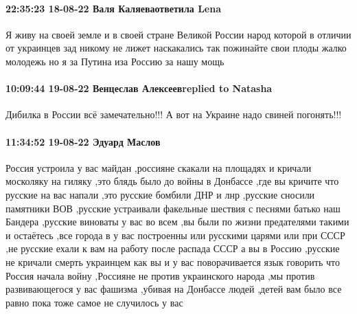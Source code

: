 \paragraph{22:35:23 18-08-22 Валя Каляеваответила Lena}

Я живу на своей земле и в своей стране Великой России народ которой в отличии
от украинцев зад никому не лижет наскакались так пожинайте свои плоды жалко
молодежь но я за Путина иза Россию за нашу мощь

\paragraph{10:09:44 19-08-22 Венцеслав Алексеевreplied to Natasha}

Дибилка в России всё замечательно!!! А вот на Украине надо свиней погонять!!!

\paragraph{11:34:52 19-08-22 Эдуард Маслов}

Россия устроила у вас майдан ,россияне скакали на площадях и кричали москоляку
на гиляку ,это блядь было до войны в Донбассе ,где вы кричите что русские на
вас напали ,это русские бомбили ДНР и лнр ,русские сносили памятники ВОВ
,русские устраивали факельные шествия с песнями батько наш Бандера ,русские
виноваты у вас во всем ,вы были по жизни предателями такими и остаётесь ,все
города в у вас построенны или русскими царями или при СССР ,не русские ехали к
вам на работу после распада СССР а вы в Россию ,русские не кричали смерть
украинцем как вы и у вас поворачивается язык говорить что Россия начала войну
,Россияне не против украинского народа ,мы против развивающегося у вас фашизма
,убивая на Донбассе людей ,детей вам было все равно пока тоже самое не
случилось у вас
